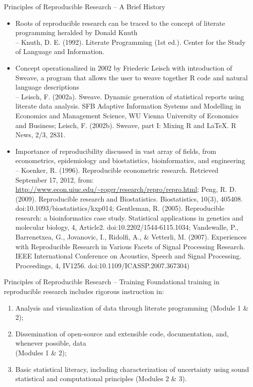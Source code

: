 \documentclass[table]{beamer}\usepackage[]{graphicx}\usepackage[]{color}
\begin{document}
\begin{frame}{Principles of Reproducible Research -- A Brief History}
\begin{itemize}
\item \scriptsize Roots of reproducible research can be traced to the concept of literate programming heralded by Donald Knuth \\
{\tiny -- Knuth, D. E. (1992). Literate Programming (1st ed.). Center for the Study of Language and Information.}
\item \scriptsize Concept  operationalized in 2002 by Friederic Leisch with introduction of Sweave, a program that allows the user to weave together R code and natural language descriptions \\
{\tiny -- Leisch, F. (2002a). Sweave. Dynamic generation of statistical reports using literate data analysis. SFB Adaptive Information Systems and Modelling in Economics and Management Science, WU Vienna University of Economics and Business; Leisch, F. (2002b). Sweave, part I: Mixing R and LaTeX. R News, 2/3, 2831.
}
\item \scriptsize Importance of reproducibility discussed in vast array of fields, from econometrics, epidemiology and biostatistics, bioinformatics, and engineering \\
{\tiny -- Koenker, R. (1996). Reproducible econometric research. Retrieved September 17, 2012, from: \url{http://www.econ.uiuc.edu/~roger/research/repro/repro.html}; Peng, R. D. (2009). Reproducible research and Biostatistics. Biostatistics, 10(3), 405408. doi:10.1093/biostatistics/kxp014; Gentleman, R. (2005). Reproducible research: a bioinformatics case study. Statistical applications in genetics and molecular biology, 4, Article2. doi:10.2202/1544-6115.1034; Vandewalle, P., Barrenetxea, G., Jovanovic, I., Ridolfi, A., \& Vetterli, M. (2007). Experiences with Reproducible Research in Various Facets of Signal Processing Research. IEEE International Conference on Acoustics, Speech and Signal Processing. Proceedings, 4, IV1256. doi:10.1109/ICASSP.2007.367304)}
\end{itemize} 
\end{frame}

\begin{frame}{Principles of Reproducible Research -- Training}
Foundational training in reproducible research includes rigorous instruction in:
\begin{enumerate}
\item Analysis and visualization of data through literate programming (Module 1 \& 2);
\item Dissemination of open-source and extensible code, documentation, and, whenever possible, data \\ (Modules 1 \& 2);
\item Basic statistical literacy, including characterization of uncertainty using sound statistical and computational principles (Modules 2 \& 3).
\end{enumerate}
\end{frame}
\end{document}
